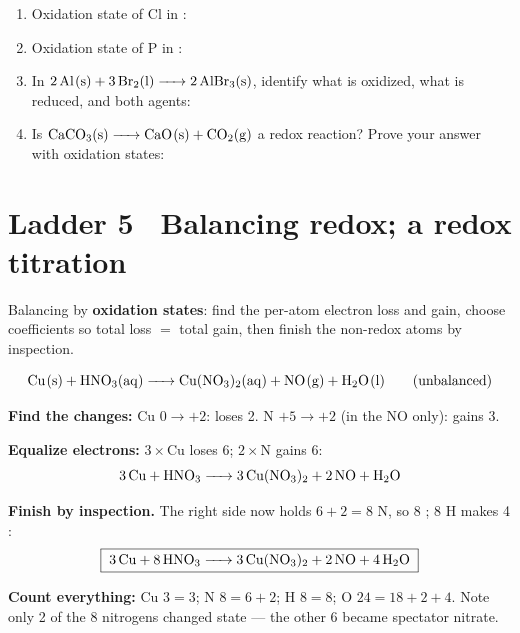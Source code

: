 \documentclass{apchem-worksheet}
\begin{document}
\begin{yourturn}
\begin{enumerate}[leftmargin=*,itemsep=0.5em]
  \item Oxidation state of Cl in : \workspace[1.2cm]
  \item Oxidation state of P in : \workspace[1.2cm]
  \item In $\ce{2Al(s) + 3Br2(l) -> 2AlBr3(s)}$, identify what is
        oxidized, what is reduced, and both agents: \workspace[1.8cm]
  \item Is $\ce{CaCO3(s) -> CaO(s) + CO2(g)}$ a redox reaction? Prove
        your answer with oxidation states: \workspace[1.8cm]
\end{enumerate}
\end{yourturn}

\section*{\sffamily Ladder 5 \textbullet\ Balancing redox; a redox
titration}

Balancing by \textbf{oxidation states}: find the per-atom electron loss
and gain, choose coefficients so total loss $=$ total gain, then finish
the non-redox atoms by inspection.

\begin{workedexample}
\[ \ce{Cu(s) + HNO3(aq) -> Cu(NO3)2(aq) + NO(g) + H2O(l)}
   \qquad\text{(unbalanced)} \]

\textbf{Find the changes:} Cu $0 \to +2$: loses 2. N $+5 \to +2$ (in the
NO only): gains 3.

\textbf{Equalize electrons:} $3 \times \text{Cu}$ loses 6;
$2 \times \text{N}$ gains 6:
\[ \ce{3Cu + HNO3 -> 3Cu(NO3)2 + 2NO + H2O} \]

\textbf{Finish by inspection.} The right side now holds $6 + 2 = 8$ N,
so 8 ; 8 H makes 4 :
\[ \boxed{\;\ce{3Cu + 8HNO3 -> 3Cu(NO3)2 + 2NO + 4H2O}\;} \]

\textbf{Count everything:} Cu $3=3$; N $8 = 6+2$; H $8 = 8$; O
$24 = 18 + 2 + 4$. Note only 2 of the 8 nitrogens changed state --- the
other 6 became spectator nitrate.
\end{workedexample}
\end{document}
